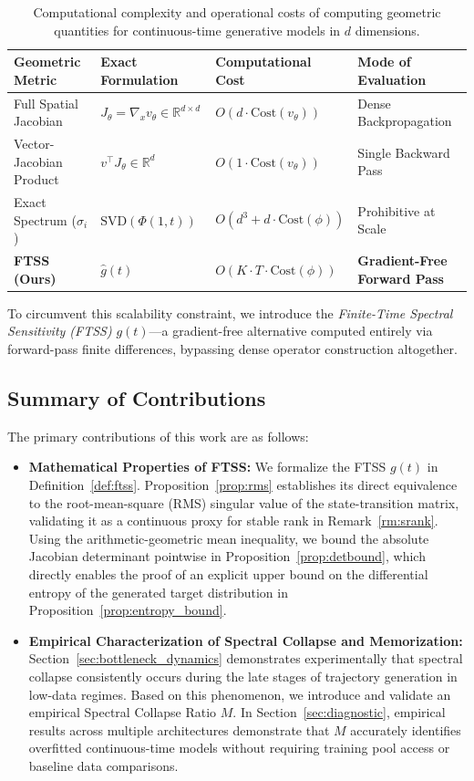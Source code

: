 \documentclass[11pt]{article}
\begin{document}
\begin{table}[htbp]
\centering
\small 
\setlength{\tabcolsep}{4pt} 
\caption{Computational complexity and operational costs of computing geometric quantities for continuous-time generative models in $d$ dimensions.}
\label{tab:computational_cost}
\begin{tabular}{@{}llll@{}}
\toprule
Geometric Metric & Exact Formulation & Computational Cost & Mode of Evaluation \\
\midrule
Full Spatial Jacobian & $J_\theta = \nabla_x v_\theta \in \mathbb{R}^{d \times d}$ & $O(d \cdot \text{Cost}(v_\theta))$ & Dense Backpropagation \\
Vector-Jacobian Product & $v^\top J_\theta \in \mathbb{R}^d$ & $O(1 \cdot \text{Cost}(v_\theta))$ & Single Backward Pass \\
Exact Spectrum ($\sigma_i$) & $\text{SVD}(\Phi(1,t))$ & $O(d^3 + d \cdot \text{Cost}(\phi))$ & Prohibitive at Scale \\
\textbf{FTSS (Ours)} & $\hat{g}(t)$ & $O(K \cdot T \cdot \text{Cost}(\phi))$ & \textbf{Gradient-Free Forward Pass} \\
\bottomrule
\end{tabular}
\end{table}

To circumvent this scalability constraint, we introduce the \emph{Finite-Time Spectral Sensitivity (FTSS)} $g(t)$---a gradient-free alternative computed entirely via forward-pass finite differences, bypassing dense operator construction altogether.

\subsection{Summary of Contributions}
The primary contributions of this work are as follows:

\begin{itemize}
    \item \textbf{Mathematical Properties of FTSS:} We formalize the FTSS $g(t)$ in Definition~\ref{def:ftss}. Proposition~\ref{prop:rms} establishes its direct equivalence to the root-mean-square (RMS) singular value of the state-transition matrix, validating it as a continuous proxy for stable rank in Remark~\ref{rm:srank}. Using the arithmetic-geometric mean inequality, we bound the absolute Jacobian determinant pointwise in Proposition~\ref{prop:detbound}, which directly enables the proof of an explicit upper bound on the differential entropy of the generated target distribution in Proposition~\ref{prop:entropy_bound}.
    \item \textbf{Empirical Characterization of Spectral Collapse and Memorization:} Section~\ref{sec:bottleneck_dynamics} demonstrates experimentally that spectral collapse consistently occurs during the late stages of trajectory generation in low-data regimes. Based on this phenomenon, we introduce and validate an empirical Spectral Collapse Ratio $M$. In Section~\ref{sec:diagnostic}, empirical results across multiple architectures demonstrate that $M$ accurately identifies overfitted continuous-time models without requiring training pool access or baseline data comparisons.
\end{itemize}
\end{document}
